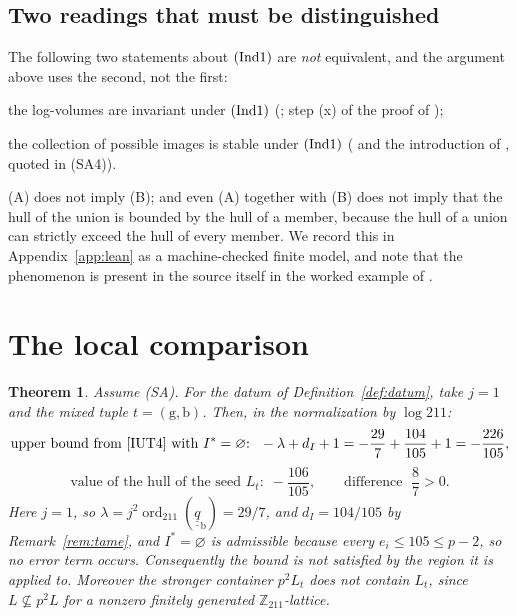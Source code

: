 \documentclass[11pt]{article}
\theoremstyle{plain}
\newtheorem{theorem}{Theorem}[section]
\theoremstyle{definition}
\newcommand{\Ind}[1]{\textup{(Ind#1)}}
\newcommand{\SA}{\textup{(SA)}}
\newcommand{\ord}{\operatorname{ord}}
\begin{document}
\subsection{Two readings that must be distinguished}\label{sec:twoparts}

The following two statements about $\Ind1$ are \emph{not} equivalent, and the
argument above uses the second, not the first:
\begin{description}[leftmargin=2.4em,style=nextline]
\item[(A) Invariance] the log-volumes are invariant under $\Ind1$
  (\cite[Proposition 3.9(i)--(iii)]{IUT3}; step (x) of the proof of
  \cite[Corollary 3.12]{IUT3});
\item[(B) Closure] the collection of possible images is stable under $\Ind1$
  (\cite[Corollary 3.12]{IUT3} and the introduction of \cite{IUT3}, quoted in
  (SA4)).
\end{description}
(A) does not imply (B); and even (A) together with (B) does not imply that the
hull of the union is bounded by the hull of a member, because the hull of a
union can strictly exceed the hull of every member.  We record this in
Appendix~\ref{app:lean} as a machine-checked finite model, and note that the
phenomenon is present in the source itself in the worked example of
\cite[Remark 3.9.5(iv)]{IUT3}.

\section{The local comparison}\label{sec:local}

\begin{theorem}\label{thm:local}
Assume \SA{}.  For the datum of Definition~\ref{def:datum}, take $j=1$ and the
mixed tuple $t=(\mathrm{g},\mathrm{b})$.  Then, in the normalization by
$\log 211$:
\[
 \text{upper bound from \cite[Proposition 1.4(iii)]{IUT4} with $I^*=\varnothing$: }\;
 -\lambda+d_I+1=-\frac{29}{7}+\frac{104}{105}+1=-\frac{226}{105},
\]
\[
 \text{value of the hull of the seed }L_t:\; -\frac{106}{105},
 \qquad\text{difference }\;\frac{8}{7}>0 .
\]
Here $j=1$, so $\lambda=j^2\ord_{211}(\underline{\underline q}_{\mathrm{b}})=29/7$, and
$d_I=104/105$ by Remark~\ref{rem:tame}, and $I^*=\varnothing$ is admissible
because every $e_i\le105\le p-2$, so no error term occurs.
Consequently the bound is not satisfied by the region it is applied to.
Moreover the stronger container $p^2L_t$ does not contain $L_t$, since
$L\not\subseteq p^2L$ for a nonzero finitely generated
$\mathbb{Z}_{211}$-lattice.
\end{theorem}
\end{document}
